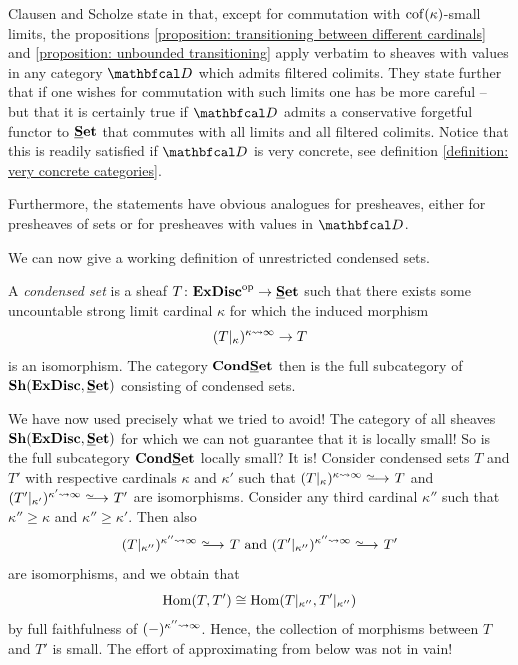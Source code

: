 \begin{remark}
	\label{remark: transitioning in general}
	
	Clausen and Scholze state in \cite[Rem. 2.10]{condenseddotpdf} that, except for commutation with ${\operatorname{cof}(\kappa)}$-small limits, the propositions \ref{proposition: transitioning between different cardinals} and \ref{proposition: unbounded transitioning} apply verbatim to sheaves with values in any category $\category{D}$ which admits filtered colimits. They state further that if one wishes for commutation with such limits one has be more careful -- but that it is certainly true if $\category{D}$ admits a conservative forgetful functor to ${{\mathbf{\underline{S}et}}}$ that commutes with all limits and all filtered colimits. Notice that this is readily satisfied if $\category{D}$ is very concrete, see definition \ref{definition: very concrete categories}.
	
	Furthermore, the statements have obvious analogues for presheaves, either for presheaves of sets or for presheaves with values in $\category{D}$.
\end{remark}

We can now give a working definition of unrestricted condensed sets.
\begin{definition}
	\label{definition: condensed sets}
	
	A \emph{condensed set} is a sheaf $T\colon {\mathbf{ExDisc}}^{\mathrm{op}} \to {{\mathbf{\underline{S}et}}}$ such that there exists some uncountable strong limit cardinal $\kappa$ for which the induced morphism
		$$(T{\vert_{\kappa}})^{\kappa\rightsquigarrow \infty} \to T$$
	is an isomorphism. The category ${{{\mathbf{Cond}}}{{\mathbf{\underline{S}et}}}}$ then is the full subcategory of $\Sheaves{\extremallyDisconnectedSets}{\Set}$ consisting of condensed sets.
\end{definition}

\begin{remark}
	\label{remark: local smallness}
	
	We have now used precisely what we tried to avoid! The category of all sheaves $\Sheaves{\extremallyDisconnectedSets}{\Set}$ for which we can not guarantee that it is locally small! So is the full subcategory ${{{\mathbf{Cond}}}{{\mathbf{\underline{S}et}}}}$ locally small? It is! Consider condensed sets $T$ and $T'$ with respective cardinals $\kappa$ and $\kappa'$ such that $(T\resTo{\kappa})^\enlargementsymbol{\kappa}{\infty}\isorightarrow T$ and $(T'\resTo{\kappa'})^\enlargementsymbol{\kappa'}{\infty}\isorightarrow T'$ are isomorphisms. Consider any third cardinal $\kappa''$ such that $\kappa'' \ge \kappa$ and $\kappa'' \ge \kappa'$. Then also
		$$(T\resTo{\kappa''})^\enlargementsymbol{\kappa''}{\infty}\isorightarrow T\text{ and }(T'\resTo{\kappa''})^\enlargementsymbol{\kappa''}{\infty}\isorightarrow T'$$
	are isomorphisms, and we obtain that
		$${\operatorname{Hom}}(T, T')\cong {\operatorname{Hom}}(T{\vert_{\kappa''}}, T'{\vert_{\kappa''}})$$
	by full faithfulness of $(-)^{\kappa''\rightsquigarrow \infty}$. Hence, the collection of morphisms between $T$ and $T'$ is small. The effort of approximating from below was not in vain!
\end{remark}

